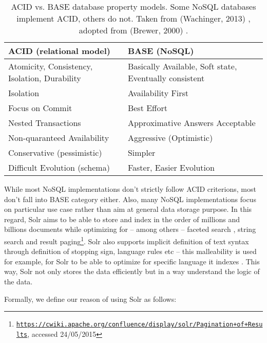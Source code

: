 \begin{table}[htbp]
\caption{ACID vs. BASE database property models. Some NoSQL databases implement ACID, others do not. Taken from (Wachinger, 2013) \citep{wachinger2013next}, adopted from (Brewer, 2000) \citep{brewer2000towards}.
}
\begin{tabularx}{\textwidth}{ | l | X | }
  \hline
  ACID (relational model) & BASE (NoSQL) \\
  \hline
  Atomicity, Consistency, Isolation, Durability & Basically Available, Soft state, Eventually consistent \\
  Isolation & Availability First \\
  Focus on Commit & Best Effort \\
  Nested Transactions & Approximative Answers Acceptable \\
  Non-quaranteed Availability & Aggressive (Optimistic) \\
  Conservative (pessimistic) & Simpler \\
  Difficult Evolution (schema) & Faster, Easier Evolution \\
  \hline
\end{tabularx}
  \label{fig:ACIDvsBASE}
\end{table}

While most NoSQL implementations don't strictly follow ACID criterions, most don't fall into BASE category either. Also, many NoSQL implementations focus on particular use case rather than aim at general data storage purpose. In this regard, Solr aims to be able to store and index in the order of millions and billions documents while optimizing for -- among others -- faceted search \citep{tunkelang2009faceted}, string search and result paging\footnote{\href{https://cwiki.apache.org/confluence/display/solr/Pagination+of+Results}{\texttt{https://cwiki.apache.org/confluence/display/solr/Pagination+of+Results}}, accessed 24/05/2015}. Solr also supports implicit definition of text syntax through definition of stopping sign, language rules etc -- this malleability is used for example, for Solr to be able to optimize for specific language it indexes \citep{grainger2014solr}. This way, Solr not only stores the data efficiently but in a way understand the logic of the data.

Formally, we define our reason of using Solr as follows:

